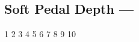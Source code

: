 \subsection[Soft Pedal Depth]{Soft Pedal Depth --- \UiKey{\I}\UiKey{\SET}}










































1
2
3
4
5
6
7
8
9
10
